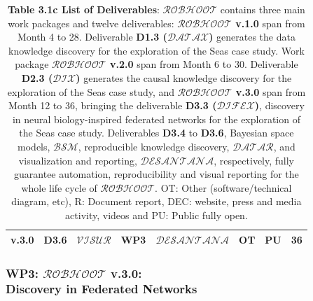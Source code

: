 \documentclass[11pt, a4paper]{article} %
\begin{document}
\begin{table}[h!]
\begin{center}
\begin{tabular}{|m{1.9cm} || m{1.25cm} || m{1.75cm} || m{0.75cm} || m{4.85cm} || m{1.2cm} || m{1cm} || m{1cm}|}
    \hline\hline
     \rowcolor{piggypink!80}
  {\bf v.3.0} & {\bf D3.6} & $\mathcal{VISUR}$ & WP3 & {\bf $\mathcal{DESANTANA}$} & OT & PU  & 36 \\
\hline\hline
  \end{tabular}
\end{center}
\caption*{{{\bf Table 3.1c List of Deliverables}: {\bf
      $\mathcal{ROBHOOT}$} contains three main work packages and
    twelve deliverables: {\bf $\mathcal{ROBHOOT}$ v.1.0} span from
    Month 4 to 28. Deliverable {\bf D1.3 ($\mathcal{DATAX}$)}
    generates the data knowledge discovery for the exploration of the
    Seas case study. Work package {\bf $\mathcal{ROBHOOT}$ v.2.0} span
    from Month 6 to 30. Deliverable {\bf D2.3 ($\mathcal{DIX}$)}
    generates the causal knowledge discovery for the exploration of
    the Seas case study, and {\bf $\mathcal{ROBHOOT}$ v.3.0} span from
    Month 12 to 36, bringing the deliverable {\bf D3.3
      ($\mathcal{DIFEX}$)}, discovery in neural biology-inspired
    federated networks for the exploration of the Seas case
    study. Deliverables {\bf D3.4} to {\bf D3.6}, Bayesian space
    models, {\bf $\mathcal{BSM}$}, reproducible knowledge discovery,
    {\bf $\mathcal{DATAR}$}, and visualization and reporting, {\bf
      $\mathcal{DESANTANA}$}, respectively, fully guarantee
    automation, reproducibility and visual reporting for the whole
    life cycle of $\mathcal{ROBHOOT}$. OT: Other (software/technical
    diagram, etc), R: Document report, DEC: website, press and media
    activity, videos and PU: Public fully open.}}
\end{table}

\subsubsection{{\bf WP3: $\mathcal{ROBHOOT}$ v.3.0}: \\
  Discovery in Federated Networks}
\end{document}

